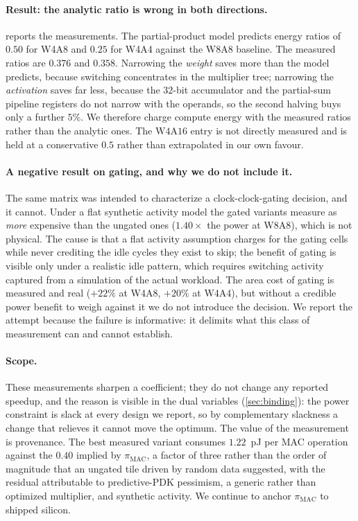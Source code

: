 \paragraph{Result: the analytic ratio is wrong in both directions.}
 reports the measurements. The partial-product model predicts
energy ratios of $0.50$ for W4A8 and $0.25$ for W4A4 against the W8A8 baseline.
The measured ratios are $0.376$ and $0.358$. Narrowing the \emph{weight} saves
more than the model predicts, because switching concentrates in the multiplier
tree; narrowing the \emph{activation} saves far less, because the $32$-bit
accumulator and the partial-sum pipeline registers do not narrow with the
operands, so the second halving buys only a further $5\%$. We therefore charge
compute energy with the measured ratios rather than the analytic ones. The
$\mathrm{W4A16}$ entry is not directly measured and is held at a conservative
$0.5$ rather than extrapolated in our own favour.

\paragraph{A negative result on gating, and why we do not include it.}
The same matrix was intended to characterize a clock-clock-gating decision, and it cannot. Under
a flat synthetic activity model the gated variants measure as \emph{more}
expensive than the ungated ones ($1.40\times$ the power at W8A8), which is not
physical. The cause is that a flat activity assumption charges for the gating
cells while never crediting the idle cycles they exist to skip; the benefit of
gating is visible only under a realistic idle pattern, which requires
switching activity captured from a simulation of the actual workload. The area
cost of gating is measured and real ($+22\%$ at W4A8, $+20\%$ at W4A4), but
without a credible power benefit to weigh against it we do not introduce the
decision. We report the attempt because the failure is informative: it delimits
what this class of measurement can and cannot establish.

\paragraph{Scope.}
These measurements sharpen a coefficient; they do not change any reported
speedup, and the reason is visible in the dual variables
(\cref{sec:binding}): the power constraint is slack at every design we report,
so by complementary slackness a change that relieves it cannot move the
optimum. The value of the measurement is provenance. The best measured variant
consumes $1.22$~pJ per MAC operation against the $0.40$ implied by
$\pi_{\mathrm{MAC}}$, a factor of three rather than the order of magnitude that
an ungated tile driven by random data suggested, with the residual attributable
to predictive-PDK pessimism, a generic rather than optimized multiplier, and
synthetic activity. We continue to anchor $\pi_{\mathrm{MAC}}$ to shipped
silicon.

